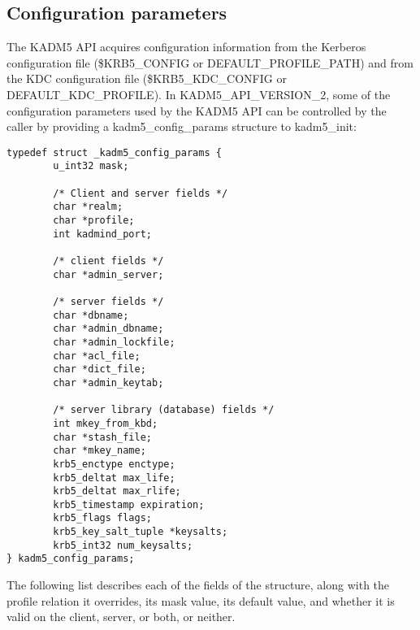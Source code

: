 \subsection{Configuration parameters}
\label{sec:configparams}

The KADM5 API acquires configuration information from the Kerberos
configuration file (\$KRB5_CONFIG or DEFAULT_PROFILE_PATH) and from
the KDC configuration file (\$KRB5_KDC_CONFIG or DEFAULT_KDC_PROFILE).
In KADM5_API_VERSION_2, some of the configuration parameters used by
the KADM5 API can be controlled by the caller by providing a
kadm5_config_params structure to kadm5_init:
%
\begin{verbatim}
typedef struct _kadm5_config_params {
        u_int32 mask;

        /* Client and server fields */
        char *realm;
        char *profile;
        int kadmind_port;

        /* client fields */
        char *admin_server;

        /* server fields */
        char *dbname;
        char *admin_dbname;
        char *admin_lockfile;
        char *acl_file;
        char *dict_file;
        char *admin_keytab;

        /* server library (database) fields */
        int mkey_from_kbd;
        char *stash_file;
        char *mkey_name;
        krb5_enctype enctype;
        krb5_deltat max_life;
        krb5_deltat max_rlife;
        krb5_timestamp expiration;
        krb5_flags flags;
        krb5_key_salt_tuple *keysalts;
        krb5_int32 num_keysalts;
} kadm5_config_params;
\end{verbatim}
%
The following list describes each of the fields of the structure,
along with the profile relation it overrides, its mask value, its
default value, and whether it is valid on the client, server, or both,
or neither.
